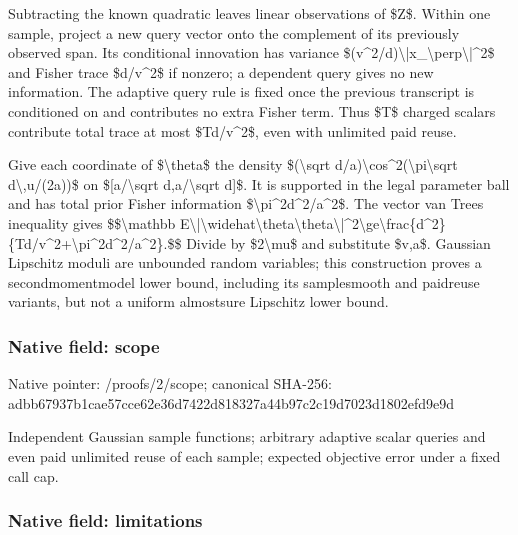 \documentclass[10pt,a4paper]{article}
\begin{document}
Subtracting the known quadratic leaves linear observations of \$Z\$. Within one sample, project a new query vector onto the complement of its previously observed span. Its conditional innovation has variance \$(v\textasciicircum{}2/d)\textbackslash{}|x\_\textbackslash{}perp\textbackslash{}|\textasciicircum{}2\$ and Fisher trace \$d/v\textasciicircum{}2\$ if nonzero; a dependent query gives no new information. The adaptive query rule is fixed once the previous transcript is conditioned on and contributes no extra Fisher term. Thus \$T\$ charged scalars contribute total trace at most \$Td/v\textasciicircum{}2\$, even with unlimited paid reuse.

Give each coordinate of \$\textbackslash{}theta\$ the density \$(\textbackslash{}sqrt d/a)\textbackslash{}cos\textasciicircum{}2(\textbackslash{}pi\textbackslash{}sqrt d\textbackslash{},u/(2a))\$ on \$[a/\textbackslash{}sqrt d,a/\textbackslash{}sqrt d]\$. It is supported in the legal parameter ball and has total prior Fisher information \$\textbackslash{}pi\textasciicircum{}2d\textasciicircum{}2/a\textasciicircum{}2\$. The vector van Trees inequality gives
\$\$\textbackslash{}mathbb E\textbackslash{}|\textbackslash{}widehat\textbackslash{}theta\textbackslash{}theta\allowbreak{}\textbackslash{}|\textasciicircum{}2\textbackslash{}ge\textbackslash{}frac\{d\textasciicircum{}2\}\{Td/v\textasciicircum{}2\allowbreak{}+\textbackslash{}pi\textasciicircum{}2d\textasciicircum{}2/a\textasciicircum{}2\}.\$\$
Divide by \$2\textbackslash{}mu\$ and substitute \$v,a\$. Gaussian Lipschitz moduli are unbounded random variables; this construction proves a secondmomentmodel lower bound, including its samplesmooth and paidreuse variants, but not a uniform almostsure Lipschitz lower bound.


\subsubsection{Native field: scope}


Native pointer: /proofs/2/scope; canonical SHA-256: adbb67937b1cae57cce62e36\allowbreak{}d7422d818327a44b97c2c19d\allowbreak{}7023d1802efd9e9d


Independent Gaussian sample functions; arbitrary adaptive scalar queries and even paid unlimited reuse of each sample; expected objective error under a fixed call cap.


\subsubsection{Native field: limitations}
\end{document}
